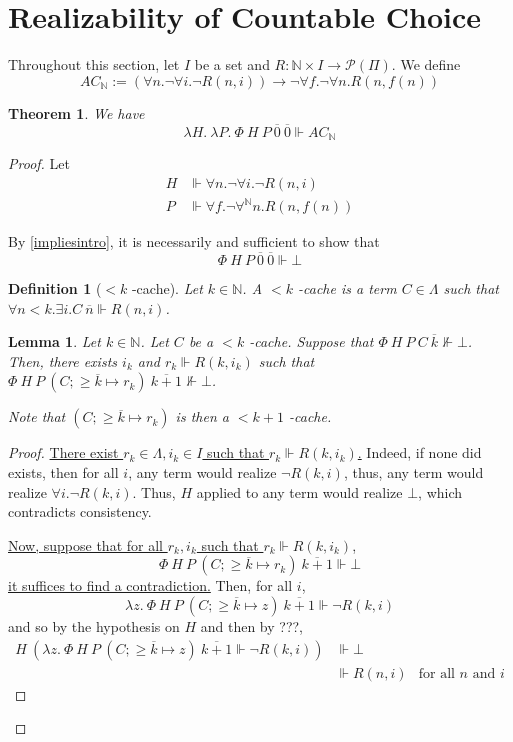 \documentclass{article}
\newcommand{\N}{\mathbb{N}}
\newcommand{\depforall}[1]{\forall^\N #1.}
\newcommand{\realizes}{\Vdash}
\newtheorem{definition}{Definition}
\newtheorem{lemma}{Lemma}
\newtheorem{theorem}{Theorem}
\begin{document}
\section{Realizability of Countable Choice}

Throughout this section, let $I$ be a set and $R: \N \times I \rightarrow \mathcal{P}(\Pi)$.
We define
\[AC_\N := (\forall n. \neg \forall i. \neg R(n, i)) \rightarrow \neg \forall f. \neg \forall n. R(n, f(n))\]

\begin{theorem} We have
    \[ \lambda H.\ \lambda P.\ \Phi\ H\ P\ \overline{0}\ \overline{0} \realizes AC_\N \]
\end{theorem}

\begin{proof}

Let
\begin{align*}
    H & \realizes \forall n. \neg \forall i. \neg R(n, i) \\
    P & \realizes \forall f. \neg \depforall{n} R(n, f(n))
\end{align*}

By \cref{impliesintro}, it is necessarily and sufficient to show that
\[\Phi\ H\ P\ \overline{0}\ \overline{0} \realizes \bot \]

\begin{definition}[$<k$ -cache]
    Let $k \in \N$. A $<k$ -cache is a term $C \in \Lambda$ such that $\forall n < k. \exists i. C\ \overline{n} \realizes R(n, i)$.
\end{definition}

\begin{lemma}\label{growcache}
    Let $k \in \N$.
    Let $C$ be a $< k$ -cache.
    Suppose that $\Phi\ H\ P\ C\ \overline{k} \not\realizes \bot$.
    Then, there exists $i_k$ and $r_k \realizes R(k, i_k)$ such that $\Phi\ H\ P\ (C; \ge \overline{k} \mapsto r_k)\ \overline{k+1} \not\realizes \bot$.

    Note that $(C; \ge \overline{k} \mapsto r_k)$ is then a $< k + 1$ -cache.
\end{lemma}

\begin{proof}
    \ul{There exist $r_k \in \Lambda, i_k \in I$ such that $r_k \realizes R(k, i_k)$.} Indeed, if none did exists, then for all $i$, any term would realize $\neg R(k, i)$, thus, any term would realize $\forall i. \neg R(k, i)$. Thus, $H$ applied to any term would realize $\bot$, which contradicts consistency.

    \ul{Now, suppose that for all $r_k, i_k$ such that $r_k \realizes R(k, i_k)$},
    \[ \Phi\ H\ P\ (C; \ge \overline{k} \mapsto r_k)\ \overline{k+1} \realizes \bot \]
    \ul{it suffices to find a contradiction.} Then, for all $i$,
    \[ \lambda z.\ \Phi\ H\ P\ (C; \ge \overline{k} \mapsto z)\ \overline{k+1} \realizes \neg R(k, i) \]
    and so by the hypothesis on $H$ and then by ???,
    \begin{align*}
        H\ (\lambda z.\ \Phi\ H\ P\ (C; \ge \overline{k} \mapsto z)\ \overline{k+1} \realizes \neg R(k, i)) & \realizes \bot \\
        & \realizes R(n, i) & \text{for all $n$ and $i$}
    \end{align*}


\end{proof}
\end{proof}
\end{document}

